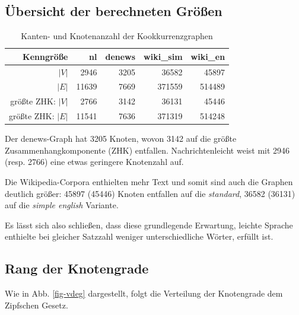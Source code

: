 \documentclass[11pt, a4paper]{article}
\begin{document}
\subsection{Übersicht der berechneten Größen}
\begin{table}[ht]
    \begin{tabular}{*{5}{r}}
    \toprule
    Kenngröße                     & nl        & denews    & wiki\_sim & wiki\_en \\
    \midrule
    $|V|$                         & 2946      & 3205      & 36582     & 45897  \\
    $|E|$                         & 11639     & 7669      & 371559    & 514489 \\
    größte ZHK: $|V|$             & 2766      & 3142      & 36131     & 45446  \\
    größte ZHK: $|E|$             & 11541     & 7636      & 371319    & 514248 \\
    \bottomrule
    \end{tabular}
    \caption{Kanten- und Knotenanzahl der Kookkurrenzgraphen}
    \label{tab-zsf}
\end{table}

Der denews-Graph hat 3205 Knoten, wovon 3142 auf die größte
Zusammenhangkomponente (ZHK) entfallen.
Nachrichtenleicht weist mit 2946 (resp. 2766) eine etwas geringere
Knotenzahl auf.

Die Wikipedia-Corpora enthielten mehr Text und somit sind auch die Graphen
deutlich größer: 45897 (45446) Knoten entfallen auf die \emph{standard},
36582 (36131) auf die \emph{simple english} Variante.

Es l\"asst sich also schlie\ss{}en, dass diese grundlegende Erwartung,
leichte Sprache enthielte bei gleicher Satzzahl weniger unterschiedliche Wörter,
erf\"ullt ist.


\subsection{Rang der Knotengrade}

Wie in Abb. \ref{fig-vdeg} dargestellt, folgt die Verteilung der Knotengrade
dem Zipfschen Gesetz.
\end{document}
